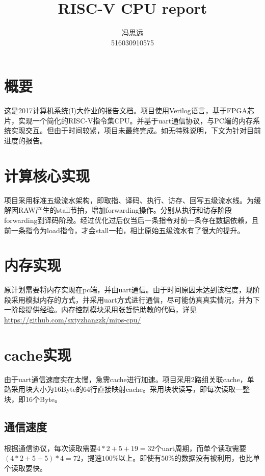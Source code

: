 \documentclass[11pt, a4paper]{article}
\title{RISC-V CPU report}
\author{冯思远\\516030910575}
\date{}
\begin{document}
\maketitle

\section{概要}
  这是2017计算机系统(I)大作业的报告文档。项目使用Verilog语言，基于FPGA芯片，实现一个简化的RISC-V指令集CPU。并基于uart通信协议，与PC端的内存系统实现交互。但由于时间较紧，项目未最终完成。如无特殊说明，下文为针对目前进度的报告。
  
\section{计算核心实现}
  项目采用标准五级流水架构，即取指、译码、执行、访存、回写五级流水线。为缓解因RAW产生的stall节拍，增加forwarding操作。分别从执行和访存阶段forwarding到译码阶段。经过优化过后仅当后一条指令对前一条存在数据依赖，且前一条指令为load指令，才会stall一拍，相比原始五级流水有了很大的提升。
\section{内存实现}
  原计划需要将内存实现在pc端，并由uart通信。由于时间原因未达到该程度，现阶段采用模拟内存的方式，并采用uart方式进行通信，尽可能仿真真实情况，并为下一阶段提供经验。内存控制模块采用张哲恺助教的代码，详见\url{https://github.com/sxtyzhangzk/mips-cpu/}

\section{cache实现}
  由于uart通信速度实在太慢，急需cache进行加速。项目采用2路组关联cache，单路采用块大小为16Byte的64行直接映射cache。采用块状读写，即每次读取一整块，即16个Byte。
  \subsection{通信速度}
  根据通信协议，每次读取需要$4*2+5+19=32$个uart周期，而单个读取需要$(4*2+5+5)*4=72$，提速$100\%$以上。即使有$50\%$的数据没有被利用，也比单个读取要快。
\end{document}
